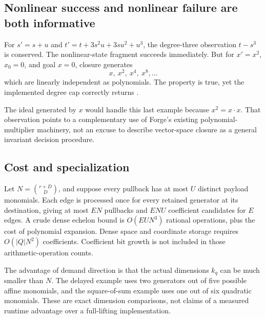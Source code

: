 \subsection{Nonlinear success and nonlinear failure are both informative}
For $s'=s+u$ and $t'=t+3s^2u+3su^2+u^3$, the degree-three observation
$t-s^3$ is conserved. The nonlinear-state fragment succeeds immediately.
But for $x'=x^2$, $x_0=0$, and goal $x=0$, closure generates
\[
 x,\ x^2,\ x^4,\ x^8,\ldots
\]
which are linearly independent as polynomials. The property is true, yet the
implemented degree cap correctly returns \unknown{}.

The ideal generated by $x$ would handle this last example because $x^2=x\cdot x$.
That observation points to a complementary use of Forge's existing
polynomial-multiplier machinery, not an excuse to describe vector-space closure
as a general invariant decision procedure.

\subsection{Cost and specialization}
Let $N=\binom{r+D}{D}$, and suppose every pullback has at most $U$ distinct
payload monomials. Each edge is processed once for every retained generator at
its destination, giving at most $EN$ pullbacks and $ENU$ coefficient
candidates for $E$ edges. A crude dense echelon bound is $O(EUN^3)$ rational
operations, plus the cost of polynomial expansion. Dense space and coordinate
storage requires $O(|Q|N^2)$ coefficients. Coefficient bit growth is not
included in those arithmetic-operation counts.

The advantage of demand direction is that the actual dimensions $k_q$ can be
much smaller than $N$. The delayed example uses two generators out of five
possible affine monomials, and the square-of-sum example uses one out of six
quadratic monomials. These are exact dimension comparisons, not claims of a
measured runtime advantage over a full-lifting implementation.
